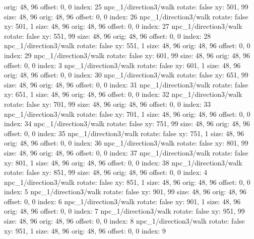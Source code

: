   orig: 48, 96
  offset: 0, 0
  index: 25
npc_1/direction3/walk
  rotate: false
  xy: 501, 99
  size: 48, 96
  orig: 48, 96
  offset: 0, 0
  index: 26
npc_1/direction3/walk
  rotate: false
  xy: 501, 1
  size: 48, 96
  orig: 48, 96
  offset: 0, 0
  index: 27
npc_1/direction3/walk
  rotate: false
  xy: 551, 99
  size: 48, 96
  orig: 48, 96
  offset: 0, 0
  index: 28
npc_1/direction3/walk
  rotate: false
  xy: 551, 1
  size: 48, 96
  orig: 48, 96
  offset: 0, 0
  index: 29
npc_1/direction3/walk
  rotate: false
  xy: 601, 99
  size: 48, 96
  orig: 48, 96
  offset: 0, 0
  index: 3
npc_1/direction3/walk
  rotate: false
  xy: 601, 1
  size: 48, 96
  orig: 48, 96
  offset: 0, 0
  index: 30
npc_1/direction3/walk
  rotate: false
  xy: 651, 99
  size: 48, 96
  orig: 48, 96
  offset: 0, 0
  index: 31
npc_1/direction3/walk
  rotate: false
  xy: 651, 1
  size: 48, 96
  orig: 48, 96
  offset: 0, 0
  index: 32
npc_1/direction3/walk
  rotate: false
  xy: 701, 99
  size: 48, 96
  orig: 48, 96
  offset: 0, 0
  index: 33
npc_1/direction3/walk
  rotate: false
  xy: 701, 1
  size: 48, 96
  orig: 48, 96
  offset: 0, 0
  index: 34
npc_1/direction3/walk
  rotate: false
  xy: 751, 99
  size: 48, 96
  orig: 48, 96
  offset: 0, 0
  index: 35
npc_1/direction3/walk
  rotate: false
  xy: 751, 1
  size: 48, 96
  orig: 48, 96
  offset: 0, 0
  index: 36
npc_1/direction3/walk
  rotate: false
  xy: 801, 99
  size: 48, 96
  orig: 48, 96
  offset: 0, 0
  index: 37
npc_1/direction3/walk
  rotate: false
  xy: 801, 1
  size: 48, 96
  orig: 48, 96
  offset: 0, 0
  index: 38
npc_1/direction3/walk
  rotate: false
  xy: 851, 99
  size: 48, 96
  orig: 48, 96
  offset: 0, 0
  index: 4
npc_1/direction3/walk
  rotate: false
  xy: 851, 1
  size: 48, 96
  orig: 48, 96
  offset: 0, 0
  index: 5
npc_1/direction3/walk
  rotate: false
  xy: 901, 99
  size: 48, 96
  orig: 48, 96
  offset: 0, 0
  index: 6
npc_1/direction3/walk
  rotate: false
  xy: 901, 1
  size: 48, 96
  orig: 48, 96
  offset: 0, 0
  index: 7
npc_1/direction3/walk
  rotate: false
  xy: 951, 99
  size: 48, 96
  orig: 48, 96
  offset: 0, 0
  index: 8
npc_1/direction3/walk
  rotate: false
  xy: 951, 1
  size: 48, 96
  orig: 48, 96
  offset: 0, 0
  index: 9

